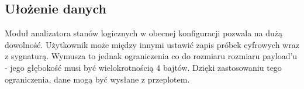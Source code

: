     \subsection{Ułożenie danych}
        Moduł analizatora stanów logicznych w obecnej konfiguracji pozwala na dużą dowolność.
        Użytkownik może między innymi ustawić zapis próbek cyfrowych wraz z sygnaturą.
        Wymusza to jednak ograniczenia co do rozmiaru rozmiaru payload'u - jego głębokość musi być wielokrotnością 4 bajtów.
        Dzięki zastosowaniu tego ograniczenia, dane mogą być wysłane z przeplotem.
